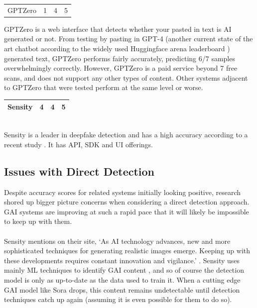 \documentclass[12pt,a4paper]{article}
\begin{document}
\begin{table}[h]
    \centering
    \begin{tabular}{|M{3cm}|M{3cm}|M{3cm}|M{3cm}|}
    GPTZero & 1 & 4 & 5\\
                           
\end{tabular}
\end{table}
\noindent GPTZero is a web interface that detects whether your pasted in text is AI generated or not. From testing by pasting in GPT-4 (another current state of the art chatbot according to the widely used Huggingface arena leaderboard \cite{huggingface}) generated text, GPTZero performs fairly accurately, predicting 6/7 samples overwhelmingly correctly. However, GPTZero is a paid service beyond 7 free scans, and does not support any other types of content. Other systems adjacent to GPTZero that were tested perform at the same level or worse.
\begin{table}[h]
    \centering
    \begin{tabular}{|M{3cm}|M{3cm}|M{3cm}|M{3cm}|}
    Sensity & 4 & 4 & 5\\
    \hline
\end{tabular}
\end{table}
\\\noindent Sensity is a leader in deepfake detection and has a high accuracy according to a recent study \cite{sensityStudy}. It has API, SDK and UI offerings.
\subsection{Issues with Direct Detection}
Despite accuracy scores for related systems initially looking positive, research shored up bigger picture concerns when considering a direct detection approach. GAI systems are improving at such a rapid pace that it will likely be impossible to keep up with them. 
\\\\Sensity mentions on their site, `As AI technology advances, new and more sophisticated techniques for generating realistic images emerge. Keeping up with these developments requires constant innovation and vigilance.' \cite{sensityBlog}. Sensity uses mainly ML techniques to identify GAI content \cite{sensityBlog}, and so of course the detection model is only as up-to-date as the data used to train it. When a cutting edge GAI model like Sora drops, this content remains undetectable until detection techniques catch up again (assuming it is even possible for them to do so).
\end{document}
